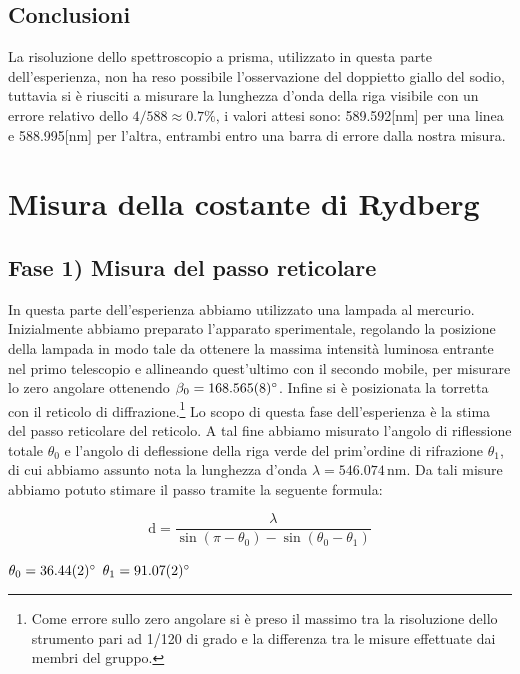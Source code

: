 \documentclass[10pt,a4paper]{article}
\begin{document}
\subsection*{Conclusioni}
La risoluzione dello spettroscopio a prisma, utilizzato in questa parte dell'esperienza, non ha reso possibile l'osservazione del doppietto giallo del sodio, tuttavia si è riusciti a misurare la lunghezza d'onda della riga visibile con un errore relativo dello $4/588\approx0.7\%$, i valori attesi sono: 589.592[nm] per una linea e 588.995[nm] per l'altra, entrambi entro una barra di errore dalla nostra misura. 

\section*{Misura della costante di Rydberg}

\subsection*{Fase 1) Misura del passo reticolare}
In questa parte dell'esperienza abbiamo utilizzato una lampada al mercurio. Inizialmente abbiamo preparato l'apparato sperimentale, regolando la posizione della lampada in modo tale da ottenere la massima intensità luminosa entrante nel primo telescopio e allineando quest'ultimo con il secondo mobile, per misurare lo zero angolare  ottenendo $\beta_0 = \ang{168.565 \pm 0.008}$. Infine si è posizionata la torretta con il reticolo di diffrazione.\footnote{Come errore sullo zero angolare si è preso il massimo tra la risoluzione dello strumento pari ad 1/120 di grado e la differenza tra le misure effettuate dai membri del gruppo.}
\newline Lo scopo di questa fase dell'esperienza è la stima del passo reticolare del reticolo. A tal fine abbiamo misurato l'angolo di riflessione totale $\theta_0$ e l'angolo di deflessione della riga verde del prim'ordine di rifrazione $\theta_1$, di cui abbiamo assunto nota la lunghezza d'onda $\lambda = 546.074\, \mathrm{nm}$. Da tali misure abbiamo potuto stimare il passo tramite la seguente formula:

\begin{equation}
    \mathrm{d} = \frac{\lambda}{\sin(\pi-\theta_0)-\sin(\theta_0-\theta_1)}
\end{equation}

\noindent$\theta_0 = \ang{36.44 \pm 0.02}$\newline
$\theta_1 = \ang{91.07 \pm 0.02}$\newline
\end{document}
